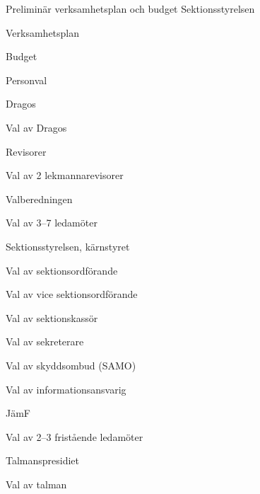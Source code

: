 \documentclass[slutlig]{sektionsmote}
\begin{document}
\begin{ootd}
\item{Preliminär verksamhetsplan och budget Sektionsstyrelsen}
\begin{ootd}
    \item Verksamhetsplan
    \item Budget
\end{ootd}


\item{Personval}
\begin{ootd}
    \item Dragos
    \begin{ootd}
        \item Val av Dragos
    \end{ootd}
    \item Revisorer
    \begin{ootd}
        \item Val av 2 lekmannarevisorer
    \end{ootd}
    \item Valberedningen
    \begin{ootd}
        \item Val av 3--7 ledamöter
    \end{ootd}
    \item Sektionsstyrelsen, kärnstyret
    \begin{ootd}
        \item Val av sektionsordförande
        \item Val av vice sektionsordförande
        \item Val av sektionskassör
        \item Val av sekreterare
        \item Val av skyddsombud (SAMO)
        \item Val av informationsansvarig
    \end{ootd}
    \item JämF
    \begin{ootd}
        \item Val av 2--3 fristående ledamöter
    \end{ootd}
    \item Talmanspresidiet
    \begin{ootd}
        \item Val av talman

\end{ootd}
\end{ootd}
\end{ootd}
\end{document}
